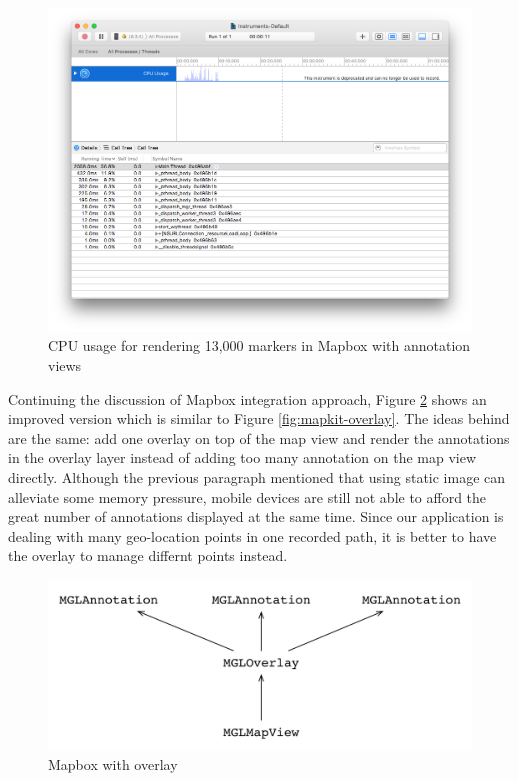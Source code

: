 \documentclass[12pt,a4paper]{article}
\begin{document}
                \begin{figure}
                    \includegraphics[width=.8\textwidth]{4-1-2-2-y}
                    \centering
                    \caption{CPU usage for rendering 13,000 markers in Mapbox with annotation views}
                    \label{fig:mapbox-performance-view}
                \end{figure}
                
                Continuing the discussion of Mapbox integration approach, Figure \ref{fig:mapbox-overlay} shows an improved version which is similar to Figure \ref{fig:mapkit-overlay}. The ideas behind are the same: add one overlay on top of the map view and render the annotations in the overlay layer instead of adding too many annotation on the map view directly. Although the previous paragraph mentioned that using static image can alleviate some memory pressure, mobile devices are still not able to afford the great number of annotations displayed at the same time. Since our application is dealing with many geo-location points in one recorded path, it is better to have the overlay to manage differnt points instead.
                
                \begin{figure}
                    \includegraphics[width=\textwidth]{4-1-2-2-d}
                    \centering
                    \caption{Mapbox with overlay}
                    \label{fig:mapbox-overlay}
                \end{figure}
                
\end{document}
